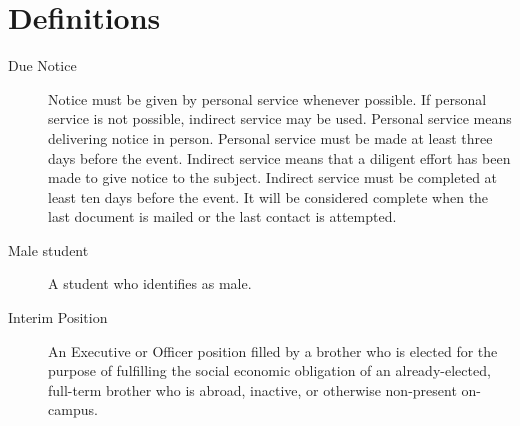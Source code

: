\chapter{Definitions}
\label{app:definitions}

\begin{description}

\item[Due Notice] Notice must be given by personal service whenever possible.
If personal service is not possible, indirect service may be used. Personal
service means delivering notice in person. Personal service must be made at
least three days before the event.
Indirect service means that a diligent effort has been made to give notice to
the subject.
Indirect service must be completed at least ten days before the event.
It will be considered complete when the last document is mailed or the last
contact is attempted.
\item[Male student] A student who identifies as male.
\item[Interim Position] An Executive or Officer position filled by a brother
who is elected for the purpose of fulfilling the social economic obligation of
an already-elected, full-term brother who is abroad, inactive, or otherwise
non-present on-campus.
\end{description}
